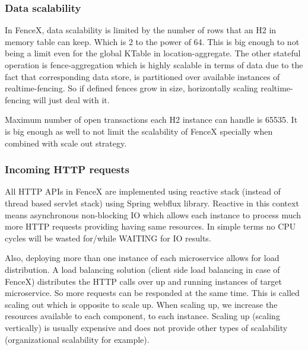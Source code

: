 \documentclass[a4]{report}
\begin{document}
        \subsubsection{Data scalability \cite{h2}}
        In FenceX, data scalability is limited by the number of rows that an H2 in memory table can keep.
        Which is 2 to the power of 64.
        This is big enough to not being a limit even for the global KTable in location-aggregate.
        The other stateful operation is fence-aggregation which is highly scalable in terms of data due to the
        fact that corresponding data store, is partitioned over available instances of realtime-fencing.
        So if defined fences grow in size, horizontally scaling realtime-fencing will just deal with it.

        Maximum number of open transactions each H2 instance can handle is 65535.
        It is big enough as well to not limit the scalability of FenceX specially when combined with scale out strategy.

        \subsubsection{Incoming HTTP requests}
        All HTTP APIs in FenceX are implemented using reactive stack (instead of thread based servlet stack) using Spring
        webflux library.
        Reactive in this context means asynchronous non-blocking IO which allows each instance to process much more HTTP
        requests providing having same resources.
        In simple terms no CPU cycles will be wasted for/while WAITING for IO results.

        Also, deploying more than one instance of each microservice allows for load distribution.
        A load balancing solution (client side load balancing in case of FenceX) distributes the HTTP calls over up and
        running instances of target microservice.
        So more requests can be responded at the same time.
        This is called scaling out which is opposite to scale up.
        When scaling up, we increase the resources available to each component, to each instance.
        Scaling up (scaling vertically) is usually expensive and does not provide other types of scalability
        (organizational scalability for example).
\end{document}
